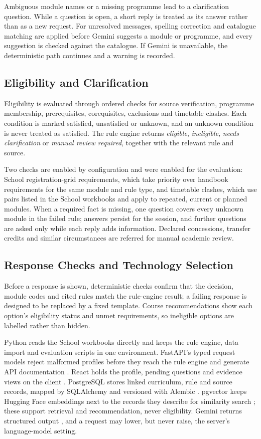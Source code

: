 Ambiguous module names or a missing programme lead to a clarification
question. While a question is open, a short reply is treated as its answer
rather than as a new request. For unresolved messages, spelling correction
and catalogue matching are applied before Gemini suggests a module or
programme, and every suggestion is checked against the catalogue. If Gemini
is unavailable, the deterministic path continues and a warning is recorded.

\subsection{Eligibility and Clarification}
Eligibility is evaluated through ordered checks for source verification,
programme membership, prerequisites, corequisites, exclusions and timetable
clashes. Each condition is marked satisfied, unsatisfied or unknown, and an
unknown condition is never treated as satisfied. The rule engine returns
\textit{eligible}, \textit{ineligible}, \textit{needs clarification} or
\textit{manual review required}, together with the relevant rule and source.

Two checks are enabled by configuration and were enabled for the
evaluation: School registration-grid requirements, which take priority over
handbook requirements for the same module and rule type, and timetable
clashes, which use pairs listed in the School workbooks and apply to
repeated, current or planned modules. When a required fact is missing, one
question covers every unknown module in the failed rule; answers persist
for the session, and further questions are asked only while each reply adds
information. Declared concessions, transfer credits and similar
circumstances are referred for manual academic review.

\subsection{Response Checks and Technology Selection}
Before a response is shown, deterministic checks confirm that the decision,
module codes and cited rules match the rule-engine result; a failing response
is designed to be replaced by a fixed template. Course recommendations show
each option's eligibility status and unmet requirements, so ineligible
options are labelled rather than hidden.

Python reads the School workbooks directly and keeps the rule engine, data
import and evaluation scripts in one environment. FastAPI's typed request
models reject malformed profiles before they reach the rule engine and
generate API documentation \cite{fastapiDocs}. React holds the profile,
pending questions and evidence views on the client \cite{reactDocs}.
PostgreSQL stores linked curriculum, rule and source records, mapped by
SQLAlchemy and versioned with Alembic \cite{sqlalchemyDocs,alembicDocs}.
pgvector keeps Hugging Face embeddings next to the records they describe for
similarity search \cite{pgvectorDocs,huggingFaceEmbeddings}; these support
retrieval and recommendation, never eligibility. Gemini returns structured
output \cite{googleStructuredOutput}, and a request may lower, but never
raise, the server's language-model setting.
